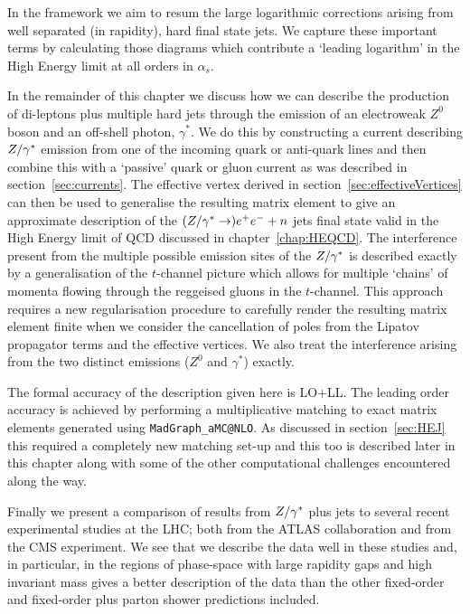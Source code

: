 	In the \hej framework we aim to resum the large logarithmic corrections
	arising from well separated (in rapidity), hard final state jets.  We capture these
	important terms by calculating those
	diagrams which contribute a `leading logarithm' in the High Energy limit
	at all orders in $\alpha_s$.

	In the remainder of this chapter we discuss how we can describe the production
	of di-leptons plus multiple hard jets through the emission of an electroweak $Z^0$
	boson and an off-shell photon, $\gamma^*$.  We do this by constructing a current
	describing $Z/\gamma^*$ emission from one of the incoming quark or anti-quark lines and
	then combine this with a `passive' quark or gluon current as was described in
	section~\ref{sec:currents}.  The effective vertex derived in section~\ref{sec:effectiveVertices}
	can then be used to generalise the resulting matrix element to give an approximate
	description of the $(Z/\gamma^*\to)e^+e^- + n$ jets final state valid in the High Energy
	limit of QCD discussed in chapter~\ref{chap:HEQCD}.  The interference
	present from the multiple possible emission sites of the $Z/\gamma^*$ is described exactly by a
	generalisation of the $t$-channel picture which allows for multiple `chains' of
	momenta flowing through the reggeised gluons in the $t$-channel.  This approach
	requires a new regularisation procedure to carefully render the resulting
	matrix element finite when we consider the cancellation of poles from the Lipatov
	propagator terms and the effective vertices.  We also treat the interference arising
	from the two distinct emissions ($Z^0$ and $\gamma^*$) exactly.

	The formal accuracy of the description given here is LO+LL.  The leading order
	accuracy is achieved by performing a multiplicative matching to exact matrix
	elements generated using \texttt{MadGraph\_aMC@NLO}.  As discussed in section~\ref{sec:HEJ}
	this required a completely new matching set-up and this too is described later in
	this chapter along with some of the other computational challenges encountered
	along the way.

	Finally we present a comparison of results from \hej $Z/\gamma^*$ plus jets to several recent
	experimental studies at the LHC; both from the ATLAS collaboration and from
	the CMS experiment.  We see that we describe the data well in these studies
	and, in particular, in the regions of phase-space with large rapidity gaps and high invariant
	mass \hej gives a better description of the data than the other fixed-order and
	fixed-order plus parton shower predictions included.

